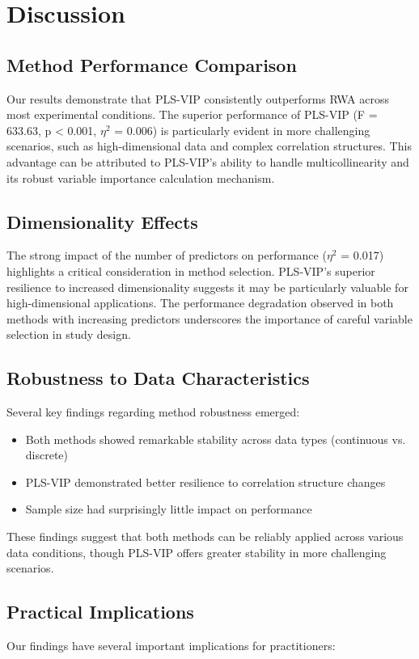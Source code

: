 \section{Discussion}

\subsection{Method Performance Comparison}
Our results demonstrate that PLS-VIP consistently outperforms RWA across most experimental conditions. The superior performance of PLS-VIP (F = 633.63, p < 0.001, $\eta^2$ = 0.006) is particularly evident in more challenging scenarios, such as high-dimensional data and complex correlation structures. This advantage can be attributed to PLS-VIP's ability to handle multicollinearity and its robust variable importance calculation mechanism.

\subsection{Dimensionality Effects}
The strong impact of the number of predictors on performance ($\eta^2$ = 0.017) highlights a critical consideration in method selection. PLS-VIP's superior resilience to increased dimensionality suggests it may be particularly valuable for high-dimensional applications. The performance degradation observed in both methods with increasing predictors underscores the importance of careful variable selection in study design.

\subsection{Robustness to Data Characteristics}
Several key findings regarding method robustness emerged:
\begin{itemize}
    \item Both methods showed remarkable stability across data types (continuous vs. discrete)
    \item PLS-VIP demonstrated better resilience to correlation structure changes
    \item Sample size had surprisingly little impact on performance
\end{itemize}

These findings suggest that both methods can be reliably applied across various data conditions, though PLS-VIP offers greater stability in more challenging scenarios.

\subsection{Practical Implications}
Our findings have several important implications for practitioners:

